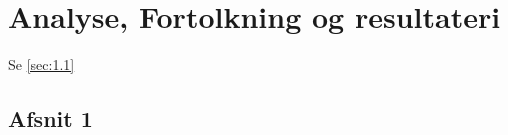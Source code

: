 \chapter{Analyse, Fortolkning og resultateri}
\label{Ch:4}

Se \vref{sec:1.1}

\lipsum*

\section{Afsnit 1}
\label{sec:1.1}

\lipsum*